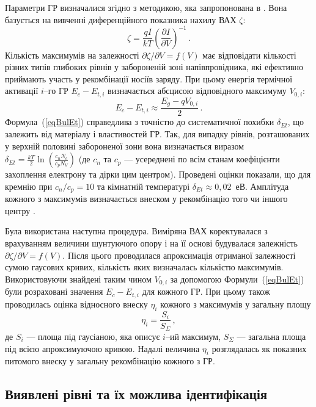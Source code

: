 Параметри ГР визначалися згідно з методикою, яка запропонована в \cite{Bulyar}.
Вона базується на вивченні диференційного показника нахилу ВАХ $\zeta$:
\begin{equation}\label{BetaVAX}
  \zeta=\frac{qI}{kT}\left(\frac{\partial I}{\partial V}\right)^{-1}\,.
\end{equation}
Кількість максимумів на залежності $\partial \zeta/ \partial V = f (V)$ має відповідати кількості різних типів глибоких
рівнів у забороненій зоні напівпровідника,
які ефективно приймають участь у рекомбінації носіїв заряду.
При цьому енергія термічної активації $i$--го ГР $E_c-E_{t,i}$ визначається абсцисою
відповідного максимуму $V_{0,i}$:
\begin{equation}\label{eqBulEt}
  E_c-E_{t,i}\approx \frac{E_g-q V_{0,i}}{2}\,.
\end{equation}
Формула~(\ref{eqBulEt}) справедлива з точністю до систематичної похибки $\delta_{Et}$,
що залежить від матеріалу і властивостей ГР.
Так, для випадку рівнів, розташованих у верхній половині забороненої зони вона визначається виразом
$\delta_{Et}=\frac{kT}{2}\ln\left(\frac{c_n N_c}{c_p N_V}\right)$
(де $c_n$ та $c_p$ --- усереднені по всім станам коефіцієнти захоплення електрону та дірки цим центром).
Проведені оцінки показали, що для кремнію при $c_n/c_p=10$ та кімнатній температурі $\delta_{Et}\approx0,02$~еВ.
Амплітуда кожного з максимумів визначається внеском у рекомбінацію того чи іншого центру \cite{Bulyar}.

Була використана наступна процедура.
Виміряна ВАХ коректувалася з врахуванням величини шунтуючого опору і на її основі будувалася залежність $\partial \zeta/ \partial V = f (V)$.
Після цього проводилася апроксимація отриманої залежності сумою гаусових кривих,
кількість яких визначалась кількістю максимумів.
Використовуючи знайдені таким чином $V_{0,i}$ за допомогою Формули~(\ref{eqBulEt}) були розраховані
значення $E_c-E_{t,i}$ для кожного ГР.
При цьому також проводилась оцінка відносного внеску $\eta_i$ кожного з максимумів у загальну площу
\begin{equation}\label{eqBulEta}
  \eta_i=\frac{S_i}{S_\Sigma}\,,
\end{equation}
де
$S_i$ --- площа під гаусіаною, яка описує $i$--ий максимум,
$S_\Sigma$ --- загальна площа під всією апроксимуючою кривою.
Надалі величина $\eta_i$ розглядалась як показних питомого внеску у загальну рекомбінацію
кожного з ГР.

\subsection{Виявлені рівні та їх можлива ідентифікація}

